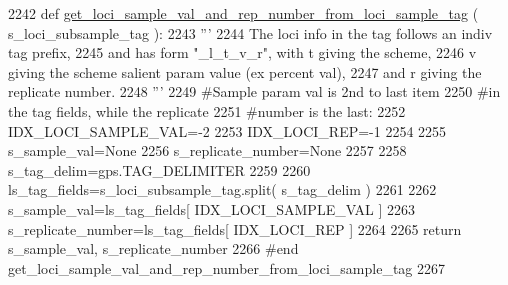 \begin{DoxyCode}
2242 \textcolor{keyword}{def }\hyperlink{namespacenegui_1_1pgdriveneestimator_ac6e046ac333dcd975329026d752ea2d9}{get\_loci\_sample\_val\_and\_rep\_number\_from\_loci\_sample\_tag}
      ( s\_loci\_subsample\_tag ):
2243     \textcolor{stringliteral}{'''}
2244 \textcolor{stringliteral}{    The loci info in the tag follows an indiv tag prefix,}
2245 \textcolor{stringliteral}{    and has form "\_l\_t\_v\_r", with t giving the scheme,}
2246 \textcolor{stringliteral}{    v giving the scheme salient param value (ex percent val),}
2247 \textcolor{stringliteral}{    and r giving the replicate number.}
2248 \textcolor{stringliteral}{    '''}
2249     \textcolor{comment}{#Sample param val is 2nd to last item}
2250     \textcolor{comment}{#in the tag fields, while the replicate}
2251     \textcolor{comment}{#number is the last:}
2252     IDX\_LOCI\_SAMPLE\_VAL=-2
2253     IDX\_LOCI\_REP=-1
2254 
2255     s\_sample\_val=\textcolor{keywordtype}{None}
2256     s\_replicate\_number=\textcolor{keywordtype}{None}
2257 
2258     s\_tag\_delim=gps.TAG\_DELIMITER
2259     
2260     ls\_tag\_fields=s\_loci\_subsample\_tag.split( s\_tag\_delim )
2261 
2262     s\_sample\_val=ls\_tag\_fields[ IDX\_LOCI\_SAMPLE\_VAL ]
2263     s\_replicate\_number=ls\_tag\_fields[ IDX\_LOCI\_REP ]
2264 
2265     \textcolor{keywordflow}{return} s\_sample\_val, s\_replicate\_number
2266 \textcolor{comment}{#end get\_loci\_sample\_val\_and\_rep\_number\_from\_loci\_sample\_tag}
2267 
\end{DoxyCode}
